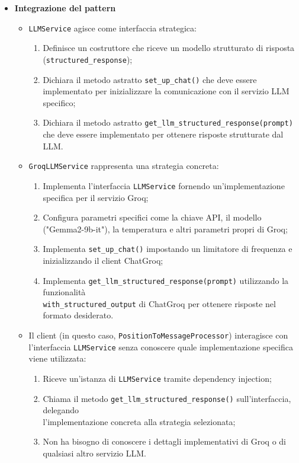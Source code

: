\documentclass[10pt]{article}
\begin{document}
\begin{itemize}
    \item \textbf{Integrazione del pattern}
    \begin{itemize}
        \item \texttt{LLMService} agisce come interfaccia strategica:
        \begin{enumerate}
            \item Definisce un costruttore che riceve un modello strutturato di risposta (\texttt{structured\_response});
            \item Dichiara il metodo astratto \texttt{set\_up\_chat()} che deve essere implementato per inizializzare la comunicazione con il servizio LLM specifico;
            \item Dichiara il metodo astratto \texttt{get\_llm\_structured\_response(prompt)} che deve essere implementato per ottenere risposte strutturate dal LLM.
        \end{enumerate}
        
        \item \texttt{GroqLLMService} rappresenta una strategia concreta:
        \begin{enumerate}
            \item Implementa l'interfaccia \texttt{LLMService} fornendo un'implementazione specifica per il servizio Groq;
            \item Configura parametri specifici come la chiave API, il modello ("Gemma2-9b-it"), la temperatura e altri parametri propri di Groq;
            \item Implementa \texttt{set\_up\_chat()} impostando un limitatore di frequenza e inizializzando il client ChatGroq;
            \item Implementa \texttt{get\_llm\_structured\_response(prompt)} utilizzando la funzionalità\\ \texttt{with\_structured\_output} di ChatGroq per ottenere risposte nel formato desiderato.
        \end{enumerate}
        
        \item Il client (in questo caso, \texttt{PositionToMessageProcessor}) interagisce con l'interfaccia \texttt{LLMService} senza conoscere quale implementazione specifica viene utilizzata:
        \begin{enumerate}
            \item Riceve un'istanza di \texttt{LLMService} tramite dependency injection;
            \item Chiama il metodo \texttt{get\_llm\_structured\_response()} sull'interfaccia, delegando\\ l'implementazione concreta alla strategia selezionata;
            \item Non ha bisogno di conoscere i dettagli implementativi di Groq o di qualsiasi altro servizio LLM.
        \end{enumerate}
        

\end{itemize}
\end{itemize}
\end{document}
